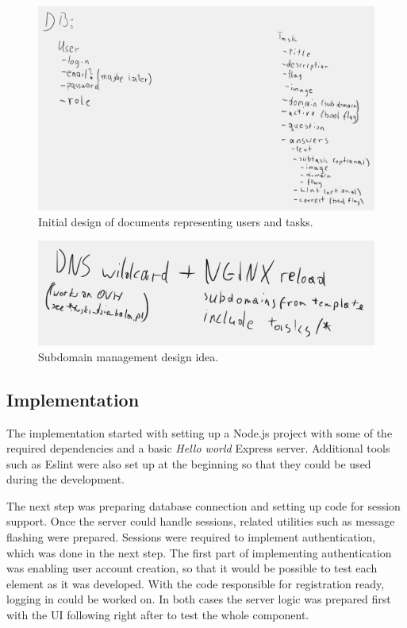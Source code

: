 \begin{figure}
	\centering
	\includegraphics[width=\textwidth]{img/init-db-struct.png}
	\caption{Initial design of documents representing users and tasks.}
	\label{fig:init-db-struct}
\end{figure}

\begin{figure}
	\centering
	\includegraphics[width=\textwidth]{img/subdomain-idea.png}
	\caption{Subdomain management design idea.}
	\label{fig:subdomain-idea}
\end{figure}

\subsection{Implementation}

The implementation started with setting up a Node.js project with some of the required dependencies and a basic \textit{Hello world} Express server. Additional tools such as Eslint were also set up at the beginning so that they could be used during the development.

The next step was preparing database connection and setting up code for session support. Once the server could handle sessions, related utilities such as message flashing were prepared. Sessions were required to implement authentication, which was done in the next step. The first part of implementing authentication was enabling user account creation, so that it would be possible to test each element as it was developed. With the code responsible for registration ready, logging in could be worked on. In both cases the server logic was prepared first with the UI following right after to test the whole component.

